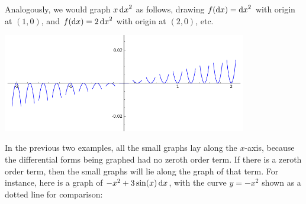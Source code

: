 \documentclass[12pt]{amsart}
\begin{document}
Analogously, we would graph $x\,{\mathrm{d} x}^2$ as follows, drawing $f({\mathrm{d} x}) = {\mathrm{d} x}^2$ with origin at $(1,0)$, and $f({\mathrm{d} x})=2\,{\mathrm{d} x}^2$ with origin at $(2,0)$, etc.
\begin{center}
  \includegraphics[width=0.8\textwidth]{x-dx2.png}
\end{center}
In the previous two examples, all the small graphs lay along the $x$-axis, because the differential forms being graphed had no zeroth order term.
If there is a zeroth order term, then the small graphs will lie along the graph of that term.
For instance, here is a graph of $-x^2 + 3\sin(x)\,{\mathrm{d} x}$, with the curve $y=-x^2$ shown as a dotted line for comparison:
\end{document}
